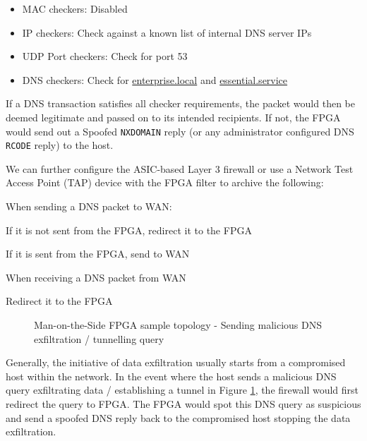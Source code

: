 \documentclass[a4paper]{report}
\newcommand{\code}{\texttt}
\newcommand{\SubItem}[1]{
    {\setlength\itemindent{15pt} \item[-] #1}
}
\begin{document}
\begin{itemize}
    \item MAC checkers: Disabled
    \item IP checkers: Check against a known list of internal DNS server IPs
    \item UDP Port checkers: Check for port 53
    \item DNS checkers: Check for \url{enterprise.local} and \url{essential.service}
\end{itemize}

If a DNS transaction satisfies all checker requirements, the packet would then be deemed legitimate and passed on to its intended recipients. If not, the FPGA would send out a Spoofed \code{NXDOMAIN} reply (or any administrator configured DNS \code{RCODE} reply) to the host.

We can further configure the ASIC-based Layer 3 firewall or use a Network Test Access Point (TAP) device with the FPGA filter to archive the following:

\begin{itemize}
    \item When sending a DNS packet to WAN:
        \SubItem    {If it is not sent from the FPGA, redirect it to the FPGA}
        \SubItem    {If it is sent from the FPGA, send to WAN}
    \item When receiving a DNS packet from WAN
        \SubItem    {Redirect it to the FPGA}
\end{itemize}


\begin{figure}[H]
  \caption{Man-on-the-Side FPGA sample topology - Sending malicious DNS exfiltration / tunnelling query}
  \label{fig:man-on-the-side-FPGA-send-malicious}
\end{figure}

Generally, the initiative of data exfiltration usually starts from a compromised host within the network. In the event where the host sends a malicious DNS query exfiltrating data / establishing a tunnel in Figure \ref{fig:man-on-the-side-FPGA-send-malicious}, the firewall would first redirect the query to FPGA. The FPGA would spot this DNS query as suspicious and send a spoofed DNS reply back to the compromised host stopping the data exfiltration. 
\end{document}
